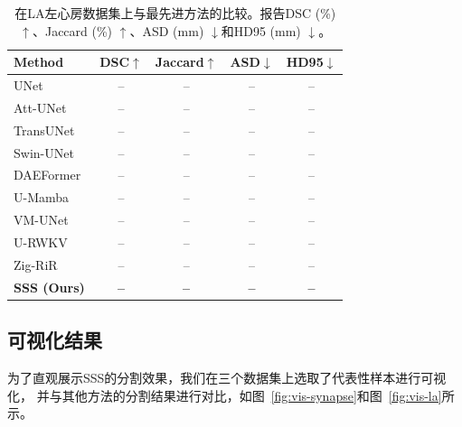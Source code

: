\documentclass[conference]{IEEEtran}   %
\begin{document}
\begin{table}[t]
\centering
\caption{在LA左心房数据集上与最先进方法的比较。报告DSC (\%) $\uparrow$、Jaccard (\%) $\uparrow$、ASD (mm) $\downarrow$和HD95 (mm) $\downarrow$。}
\label{tab:la}
\begin{tabular}{lcccc}
\toprule
Method & DSC$\uparrow$ & Jaccard$\uparrow$ & ASD$\downarrow$ & HD95$\downarrow$ \\
\midrule
UNet~\cite{Unet}              & --    & --    & --    & --    \\
Att-UNet~\cite{attetion-unet} & --    & --    & --    & --    \\
TransUNet~\cite{transunet}    & --    & --    & --    & --    \\
Swin-UNet~\cite{swinunet}     & --    & --    & --    & --    \\
DAEFormer~\cite{daeformer}    & --    & --    & --    & --    \\
U-Mamba~\cite{umamba}         & --    & --    & --    & --    \\
VM-UNet~\cite{vmunet}         & --    & --    & --    & --    \\
U-RWKV~\cite{urwkv}          & --    & --    & --    & --    \\
Zig-RiR~\cite{zigrir}        & --    & --    & --    & --    \\
\midrule
\textbf{SSS (Ours)}          & \textbf{--} & \textbf{--} & \textbf{--} & \textbf{--} \\
\bottomrule
\end{tabular}
\end{table}

\subsection{可视化结果}
为了直观展示SSS的分割效果，我们在三个数据集上选取了代表性样本进行可视化，
并与其他方法的分割结果进行对比，如图~\ref{fig:vis-synapse}和图~\ref{fig:vis-la}所示。


\end{document}
